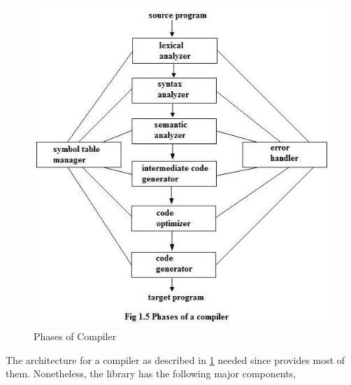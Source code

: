 \documentclass[thesis-solanki.tex]{subfiles}
\begin{document}
\begin{figure}[th]
\centering
\includegraphics[scale = 0.7]{Phases_of_compiler.jpg}
\caption{Phases of Compiler \cite{Aho:1986:CPT:6448}}
\label{fig:Phases of Compiler}
\end{figure}

The architecture for a compiler as described in \ref{fig:Phases of Compiler}  needed
since  provides most of
them.
Nonetheless, the library has the following major components,

\end{document}
